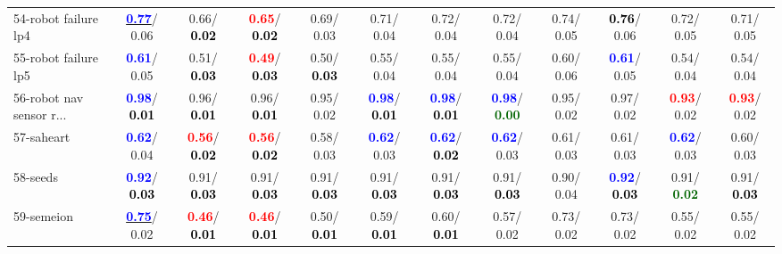 \begin{table}[h]
\begin{center}
{\begin{tabular}{lc|c|c|c|c|c|c|c|c|c|c}
54-robot failure lp4 & \underline{\textcolor{blue}{\textbf{  0.77}}}/  0.06 &   0.66/\textcolor{black}{\textbf{  0.02}} & \textcolor{red}{\textbf{  0.65}}/\textcolor{black}{\textbf{  0.02}} &   0.69/  0.03 &   0.71/  0.04 &   0.72/  0.04 &   0.72/  0.04 &   0.74/  0.05 & \textcolor{black}{\textbf{  0.76}}/  0.06 &   0.72/  0.05 &   0.71/  0.05 \\
55-robot failure lp5 & \textcolor{blue}{\textbf{  0.61}}/  0.05 &   0.51/\textcolor{black}{\textbf{  0.03}} & \textcolor{red}{\textbf{  0.49}}/\textcolor{black}{\textbf{  0.03}} &   0.50/\textcolor{black}{\textbf{  0.03}} &   0.55/  0.04 &   0.55/  0.04 &   0.55/  0.04 &   0.60/  0.06 & \textcolor{blue}{\textbf{  0.61}}/  0.05 &   0.54/  0.04 &   0.54/  0.04 \\
56-robot nav sensor r... & \textcolor{blue}{\textbf{  0.98}}/\textcolor{black}{\textbf{  0.01}} &   0.96/\textcolor{black}{\textbf{  0.01}} &   0.96/\textcolor{black}{\textbf{  0.01}} &   0.95/  0.02 & \textcolor{blue}{\textbf{  0.98}}/\textcolor{black}{\textbf{  0.01}} & \textcolor{blue}{\textbf{  0.98}}/\textcolor{black}{\textbf{  0.01}} & \textcolor{blue}{\textbf{  0.98}}/\textcolor{darkgreen}{\textbf{  0.00}} &   0.95/  0.02 &   0.97/  0.02 & \textcolor{red}{\textbf{  0.93}}/  0.02 & \textcolor{red}{\textbf{  0.93}}/  0.02 \\
57-saheart & \textcolor{blue}{\textbf{  0.62}}/  0.04 & \textcolor{red}{\textbf{  0.56}}/\textcolor{black}{\textbf{  0.02}} & \textcolor{red}{\textbf{  0.56}}/\textcolor{black}{\textbf{  0.02}} &   0.58/  0.03 & \textcolor{blue}{\textbf{  0.62}}/  0.03 & \textcolor{blue}{\textbf{  0.62}}/\textcolor{black}{\textbf{  0.02}} & \textcolor{blue}{\textbf{  0.62}}/  0.03 &   0.61/  0.03 &   0.61/  0.03 & \textcolor{blue}{\textbf{  0.62}}/  0.03 &   0.60/  0.03 \\
58-seeds & \textcolor{blue}{\textbf{  0.92}}/\textcolor{black}{\textbf{  0.03}} &   0.91/\textcolor{black}{\textbf{  0.03}} &   0.91/\textcolor{black}{\textbf{  0.03}} &   0.91/\textcolor{black}{\textbf{  0.03}} &   0.91/\textcolor{black}{\textbf{  0.03}} &   0.91/\textcolor{black}{\textbf{  0.03}} &   0.91/\textcolor{black}{\textbf{  0.03}} &   0.90/  0.04 & \textcolor{blue}{\textbf{  0.92}}/\textcolor{black}{\textbf{  0.03}} &   0.91/\textcolor{darkgreen}{\textbf{  0.02}} &   0.91/\textcolor{black}{\textbf{  0.03}} \\
59-semeion & \underline{\textcolor{blue}{\textbf{  0.75}}}/  0.02 & \textcolor{red}{\textbf{  0.46}}/\textcolor{black}{\textbf{  0.01}} & \textcolor{red}{\textbf{  0.46}}/\textcolor{black}{\textbf{  0.01}} &   0.50/\textcolor{black}{\textbf{  0.01}} &   0.59/\textcolor{black}{\textbf{  0.01}} &   0.60/\textcolor{black}{\textbf{  0.01}} &   0.57/  0.02 &   0.73/  0.02 &   0.73/  0.02 &   0.55/  0.02 &   0.55/  0.02 \\

\end{tabular}}
\end{center}
\end{table}
